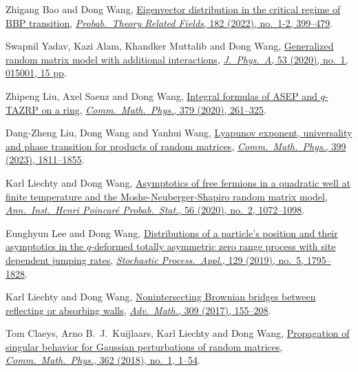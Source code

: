 \begin{etaremune}
  Zhigang Bao and Dong Wang, \href{https://arxiv.org/abs/2009.13143}{Eigenvector distribution in the critical regime of BBP transition}, \href{https://doi.org/10.1007/s00440-021-01062-4}{\textit{Probab.\ Theory  Related Fields}, 182 (2022), no.\ 1-2, 399--479}.
\item
  Swapnil Yadav, Kazi Alam, Khandker Muttalib and Dong Wang, \href{https://arxiv.org/abs/1908.03726}{Generalized random matrix model with additional interactions}, \href{https://dx.doi.org/10.1088/1751-8121/ab56e0}{\textit{J.\ Phys.\ A}, 53 (2020), no.\ 1, 015001, 15 pp}.
\item
  Zhipeng Liu, Axel Saenz and Dong Wang, \href{https://arxiv.org/abs/1905.02987}{Integral formulas of ASEP and $q$-TAZRP on a ring}, \href{https://doi.org/10.1007/s00220-020-03837-7}{\textit{Comm.\ Math.\ Phys.}, 379 (2020), 261--325}.
\item
  Dang-Zheng Liu, Dong Wang and Yanhui Wang, \href{https://arxiv.org/abs/1810.00433}{Lyapunov exponent, universality and phase transition for products of random matrices}, \href{https://doi.org/10.1007/s00220-022-04584-7}{\textit{Comm.\ Math.\ Phys.}, 399 (2023), 1811--1855}. 
\item
  Karl Liechty and Dong Wang, \href{https://arxiv.org/abs/1706.06653}{Asymptotics of free fermions in a quadratic well at finite temperature and the Moshe-Neuberger-Shapiro random matrix model}, \href{https://doi.org/10.1214/19-AIHP994}{\textit{Ann.\ Inst.\ Henri Poincar\'{e} Probab.\ Stat.}, 56 (2020), no.\ 2, 1072--1098}.
\item
  Eunghyun Lee and Dong Wang, \href{https://arxiv.org/abs/1703.08839}{Distributions of a particle's position and their asymptotics in the $q$-deformed totally asymmetric zero range process with site dependent jumping rates}, \href{https://doi.org/10.1016/j.spa.2018.06.005}{\textit{Stochastic Process.\ Appl.}, 129 (2019), no.\ 5, 1795--1828}.
\item
  Karl Liechty and Dong Wang, \href{http://arxiv.org/abs/1608.08712}{Nonintersecting Brownian bridges between reflecting or absorbing walls}, \href{https://doi.org/10.1016/j.aim.2016.10.024}{\textit{Adv.\ Math.}, 309 (2017), 155--208}.
\item
  Tom Claeys, Arno B.~J.~Kuijlaars, Karl Liechty and Dong Wang, \href{http://arxiv.org/abs/1608.05870}{Propagation of singular behavior for Gaussian perturbations of random matrices}, \href{https://doi.org/10.1007/s00220-018-3195-8}{\textit{Comm.\ Math.\ Phys.}, 362 (2018), no.\ 1, 1--54}.
\item

\end{etaremune}
